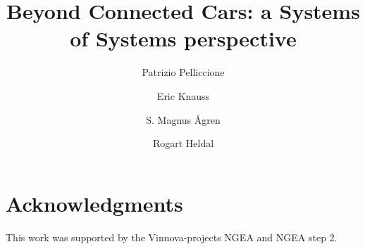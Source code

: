 \documentclass[preprint]{elsarticle}
\begin{document}
\begin{frontmatter}

\title{Beyond Connected Cars: a Systems of Systems perspective
}

\author[uda,gu]{Patrizio Pelliccione}
\author[gu]{Eric Knauss}
\author[gu]{S. Magnus Ågren}
\author[ber]{Rogart Heldal}


\address[uda]{Universit\`a degli Studi dell'Aquila,
  Dipartimento di Informatica,\\
  {\tt patrizio.pelliccione@univaq.it}}
\address[gu]{Chalmers $\mid$ Gothenburg University
  Gothenburg, Sweden\\
  {\tt \{erik.knauss,patrizio.pelliccione\}@gu.se}\\{\tt magnus.agren@chalmers.se}}
\address[ber]{Western Norway University of Applied Sciences,
Bergen, Norway\\
  {\tt rogardt.heldal@hvl.no} } 


\end{frontmatter}












\section*{Acknowledgments}
This work was supported by the Vinnova-projects NGEA and NGEA step 2. 



\end{document}
